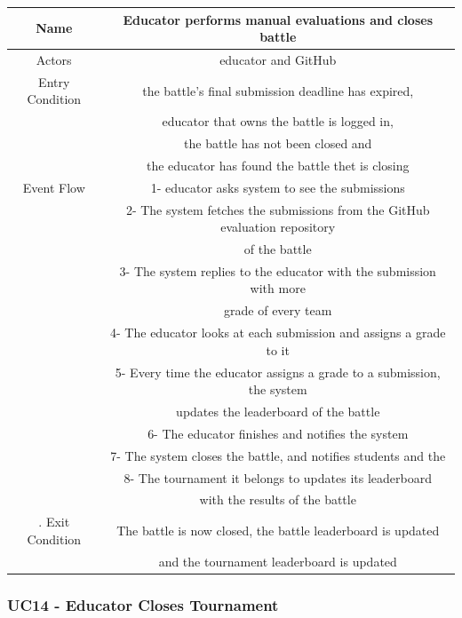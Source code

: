 \documentclass{article}
\begin{document}
\begin{tabular*}{\linewidth}{@{\extracolsep{\fill}} cc }
    \hline
    Name & Educator performs manual evaluations and closes battle\\ 
    \hline
    Actors & educator and GitHub\\ 
    \hline
    Entry Condition & the battle's final submission deadline has expired,\\
                    & educator that owns the battle is logged in, \\
                    & the battle has not been closed and\\
                    & the educator has found the battle thet is closing\\
    \hline
    Event Flow & 1- educator asks system to see the submissions\\
               & 2- The system fetches the submissions from the GitHub evaluation repository\\
               & of the battle\\
               & 3- The system replies to the educator with the submission with more \\
               & grade of every team\\
               & 4- The educator looks at each submission and assigns a grade to it\\
               & 5- Every time the educator assigns a grade to a submission, the system\\
               & updates the leaderboard of the battle\\
               & 6- The educator finishes and notifies the system\\
               & 7- The system closes the battle, and notifies students and the \\
               & 8- The tournament it belongs to updates its leaderboard \\
               & with the results of the battle \\
    \hline.
    Exit Condition & The battle is now closed, the battle leaderboard is updated\\
                   & and the tournament leaderboard is updated\\
    \hline
\end{tabular*}

\subsubsection*{UC14 - Educator Closes Tournament}
\end{document}
